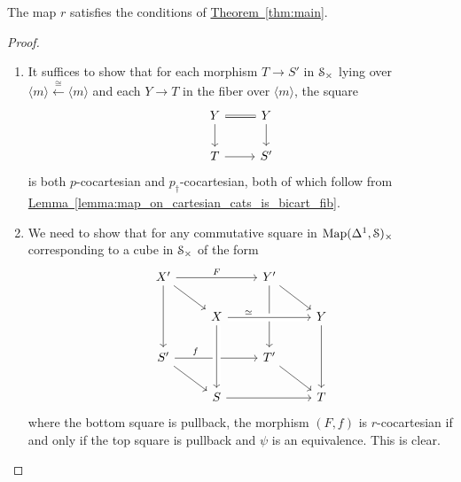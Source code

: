 \documentclass[main.tex]{subfiles}
\begin{document}
\begin{lemma}
  The map $r$ satisfies the conditions of \hyperref[thm:main]{Theorem~\ref*{thm:main}}.
\end{lemma}
\begin{proof}
  \begin{enumerate}
    \item It suffices to show that for each morphism $T \to S'$ in $\S_{\times}$ lying over $\langle m \rangle \overset{\cong}{\leftarrow} \langle m \rangle$ and each $Y \to T$ in the fiber over $\langle m \rangle$, the square
      \begin{equation*}
        \begin{tikzcd}
          Y
          \arrow[r, equals]
          \arrow[d]
          & Y
          \arrow[d]
          \\
          T
          \arrow[r]
          & S'
        \end{tikzcd}
      \end{equation*}
      is both $p$-cocartesian and $p_{\dagger}$-cocartesian, both of which follow from \hyperref[lemma:map_on_cartesian_cats_is_bicart_fib]{Lemma~\ref*{lemma:map_on_cartesian_cats_is_bicart_fib}}.

    \item We need to show that for any commutative square in $\Map(\Delta^{1}, \S)_{\times}$ corresponding to a cube in $\S_{\times}$ of the form
      \begin{equation*}
        \begin{tikzcd}
          X'
          \arrow[rr, "F"]
          \arrow[dd]
          \arrow[dr]
          && Y'
          \arrow[dd]
          \arrow[dr]
          \\
          & X
          \arrow[rr, crossing over, near start, "\simeq"]
          && Y
          \arrow[dd]
          \\
          S'
          \arrow[dr]
          \arrow[rr, near start, "f"]
          && T'
          \arrow[dr]
          \\
          & S
          \arrow[from=uu, crossing over]
          \arrow[rr]
          && T
        \end{tikzcd}
      \end{equation*}
      where the bottom square is pullback, the morphism $(F, f)$ is $r$-cocartesian if and only if the top square is pullback and $\psi$ is an equivalence. This is clear.
  \end{enumerate}
\end{proof}
\end{document}
